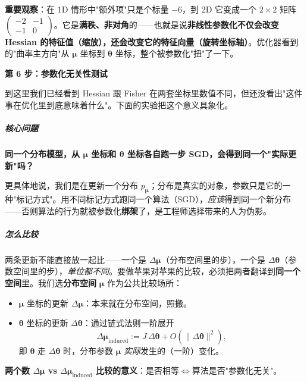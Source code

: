 \documentclass[11pt,a4paper]{article}
\theoremstyle{mythm}
\theoremstyle{mydef}
\begin{document}
\textbf{重要观察}：在 1D 情形中"额外项"只是个标量 $-6$，到 2D 它变成一个 $2\times 2$ 矩阵 $\begin{pmatrix}-2 & -1\\ -1 & 0\end{pmatrix}$。它是\textbf{满秩、非对角}的——也就是说\textbf{非线性参数化不仅会改变 Hessian 的特征值（缩放），还会改变它的特征向量（旋转坐标轴）}。优化器看到的"曲率主方向"从 $\boldsymbol\mu$ 坐标到 $\boldsymbol\theta$ 坐标，整个被参数化"扭"了一下。

\textbf{第 6 步：参数化无关性测试}

到这里我们已经看到 Hessian 跟 Fisher 在两套坐标里数值不同，但还没看出"这件事在优化里到底意味着什么"。下面的实验把这个意义具象化。

\subparagraph{核心问题}
\textbf{同一个分布模型，从 $\boldsymbol\mu$ 坐标和 $\boldsymbol\theta$ 坐标各自跑一步 SGD，会得到同一个"实际更新"吗？}

更具体地说，我们是在更新一个分布 $p_{\boldsymbol\mu}$；分布是真实的对象，参数只是它的一种"标记方式"。用不同标记方式跑同一个算法（SGD），\emph{应该}得到同一个新分布——否则算法的行为就被参数化\textbf{绑架}了，是工程师选择带来的人为伪影。

\subparagraph{怎么比较}
两条更新不能直接放一起比——一个是 $\Delta\boldsymbol\mu$（分布空间里的步），一个是 $\Delta\boldsymbol\theta$（参数空间里的步），\emph{单位都不同}。要做苹果对苹果的比较，必须把两者翻译到\textbf{同一个空间}里。我们选\textbf{分布空间} $\boldsymbol\mu$ 作为公共比较场所：
\begin{itemize}[leftmargin=2em]
\item $\boldsymbol\mu$ 坐标的更新 $\Delta\boldsymbol\mu$：本来就在分布空间，照搬。
\item $\boldsymbol\theta$ 坐标的更新 $\Delta\boldsymbol\theta$：通过链式法则一阶展开
$$\Delta\boldsymbol\mu_{\text{induced}} := J\,\Delta\boldsymbol\theta + O(\|\Delta\boldsymbol\theta\|^2),$$
即 $\boldsymbol\theta$ 走 $\Delta\boldsymbol\theta$ 时，分布参数 $\boldsymbol\mu$ \emph{实际}发生的（一阶）变化。
\end{itemize}

\textbf{两个数 $\Delta\boldsymbol\mu$ vs $\Delta\boldsymbol\mu_{\text{induced}}$ 比较的意义}：是否相等\;$\Longleftrightarrow$\;算法是否"参数化无关"。
\end{document}
